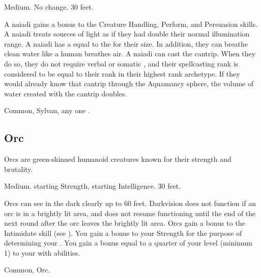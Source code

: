          Medium.
         No change.
         30 feet.
        \begin{itemize}
             A naiadi gains a  bonus to the Creature Handling, Perform, and Persuasion skills.
             A naiadi treats sources of light as if they had double their normal illumination range.
             A naiadi has a  equal to the  for their size.
                In addition, they can breathe clean water like a human breathes air.
             A naiadi can cast the  cantrip.
                When they do so, they do not require verbal or somatic , and their spellcasting rank is considered to be equal to their rank in their highest rank archetype.
                If they would already know that cantrip through the Aquamancy sphere, the volume of water created with the cantrip doubles.
        \end{itemize}
         Common, Sylvan, any one .

    \subsection{Orc}
        Orcs are green-skinned humanoid creatures known for their strength and brutality.

         Medium.
          starting Strength,  starting Intelligence.
         30 feet.
        \begin{itemize}
             Orcs can see in the dark clearly up to 60 feet.
                Darkvision does not function if an orc is in a brightly lit area, and does not resume functioning until the end of the next round after the orc leaves the brightly lit area.
             Orcs gain a  bonus to the Intimidate skill (see ).
             You gain a  bonus to your Strength for the purpose of determining your .
             You gain a bonus equal to a quarter of your level (minimum 1) to your  with  abilities.
        \end{itemize}
         Common, Orc.

